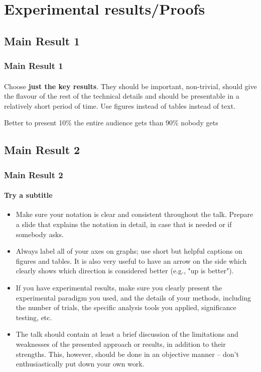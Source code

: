 \documentclass[11pt]{beamer}              %
\begin{document}
\section{Experimental results/Proofs}

\subsection{Main Result 1}
\begin{frame}
\frametitle{Main Result 1}
\framesubtitle{}
Choose \textbf{just the key results}. They should be important, non-trivial, should give the flavour of the rest of the technical details and should be presentable in a relatively short period of time. Use figures instead of tables instead of text.

Better to present 10\% the entire audience gets than 90\% nobody gets
\end{frame}


\subsection{Main Result 2}
\begin{frame}
\frametitle{Main Result 2}
\framesubtitle{Try a subtitle}
\begin{itemize}
\item Make sure your notation is clear and consistent throughout the talk. Prepare a slide that explains the notation in detail, in case that is needed or if somebody asks.
\item Always label all of your axes on graphs; use short but helpful captions on figures and tables. It is also very useful to have an arrow on the side which clearly shows which direction is considered better (e.g., "up is better").
\item If you have experimental results, make sure you clearly present the experimental paradigm you used, and the details of your methods, including the number of trials, the specific analysis tools you applied, significance testing, etc.
\item The talk should contain at least a brief discussion of the limitations and weaknesses of the presented approach or results, in addition to their strengths. This, however, should be done in an objective manner -- don't enthusiastically put down your own work.
\end{itemize}
\end{frame}
\end{document}
